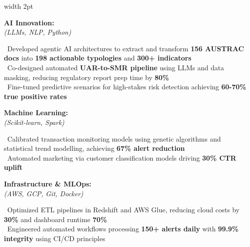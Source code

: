 \documentclass[11pt,a4paper]{article}
\begin{document}
\noindent\begin{minipage}{\textwidth}
\hspace{2pt}\vrule width 2pt\hspace{15pt}%
\begin{minipage}[t]{\textwidth-19pt}

\noindent\begin{minipage}[t]{0.28\textwidth}
\textbf{\color{headerblue}AI Innovation:}\\[0pt]
\textit{(LLMs, NLP, Python)}
\end{minipage}%
\hfill%
\begin{minipage}[t]{0.68\textwidth}
\textbullet\ Developed agentic AI architectures to extract and transform \textbf{156 AUSTRAC docs} into \textbf{198 actionable typologies} and \textbf{300+ indicators}\\
\textbullet\ Co-designed automated \textbf{UAR-to-SMR pipeline} using LLMs and data masking, reducing regulatory report prep time by \textbf{80\%}\\
\textbullet\ Fine-tuned predictive scenarios for high-stakes risk detection achieving \textbf{60-70\% true positive rates}
\end{minipage}

\vspace{6pt}

\noindent\begin{minipage}[t]{0.28\textwidth}
\textbf{\color{headerblue}Machine Learning:}\\[0pt]
\textit{(Scikit-learn, Spark)}
\end{minipage}%
\hfill%
\begin{minipage}[t]{0.68\textwidth}
\textbullet\ Calibrated transaction monitoring models using genetic algorithms and statistical trend modelling, achieving \textbf{67\% alert reduction}\\
\textbullet\ Automated marketing via customer classification models driving \textbf{30\% CTR uplift}
\end{minipage}

\vspace{6pt}

\noindent\begin{minipage}[t]{0.28\textwidth}
\textbf{\color{headerblue}Infrastructure \& MLOps:}\\[0pt]
\textit{(AWS, GCP, Git, Docker)}
\end{minipage}%
\hfill%
\begin{minipage}[t]{0.68\textwidth}
\textbullet\ Optimized ETL pipelines in Redshift and AWS Glue, reducing cloud costs by \textbf{30\%} and dashboard runtime \textbf{70\%}\\
\textbullet\ Engineered automated workflows processing \textbf{150+ alerts daily} with \textbf{99.9\% integrity} using CI/CD principles
\end{minipage}


\end{minipage}
\end{minipage}
\end{document}
